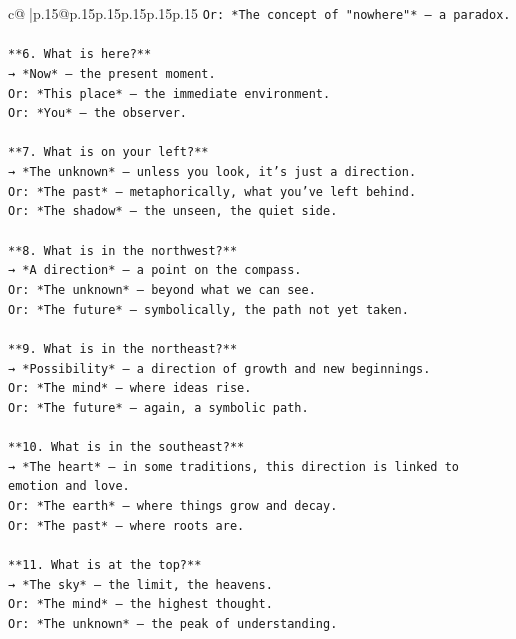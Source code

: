 \documentclass{article}
\begin{document}
{\begin{supertabular}{c@{$\;$}|p{.15\linewidth}@{}p{.15\linewidth}p{.15\linewidth}p{.15\linewidth}p{.15\linewidth}p{.15\linewidth}}
{{{\texttt{Or: *The concept of "nowhere"* — a paradox.} \\
\\ 
\texttt{**6. What is here?**  } \\
\texttt{→ *Now* — the present moment.  } \\
\texttt{Or: *This place* — the immediate environment.  } \\
\texttt{Or: *You* — the observer.} \\
\\ 
\texttt{**7. What is on your left?**  } \\
\texttt{→ *The unknown* — unless you look, it’s just a direction.  } \\
\texttt{Or: *The past* — metaphorically, what you’ve left behind.  } \\
\texttt{Or: *The shadow* — the unseen, the quiet side.} \\
\\ 
\texttt{**8. What is in the northwest?**  } \\
\texttt{→ *A direction* — a point on the compass.  } \\
\texttt{Or: *The unknown* — beyond what we can see.  } \\
\texttt{Or: *The future* — symbolically, the path not yet taken.} \\
\\ 
\texttt{**9. What is in the northeast?**  } \\
\texttt{→ *Possibility* — a direction of growth and new beginnings.  } \\
\texttt{Or: *The mind* — where ideas rise.  } \\
\texttt{Or: *The future* — again, a symbolic path.} \\
\\ 
\texttt{**10. What is in the southeast?**  } \\
\texttt{→ *The heart* — in some traditions, this direction is linked to emotion and love.  } \\
\texttt{Or: *The earth* — where things grow and decay.  } \\
\texttt{Or: *The past* — where roots are.} \\
\\ 
\texttt{**11. What is at the top?**  } \\
\texttt{→ *The sky* — the limit, the heavens.  } \\
\texttt{Or: *The mind* — the highest thought.  } \\
\texttt{Or: *The unknown* — the peak of understanding.} \\
}}}
\end{supertabular}}
\end{document}

